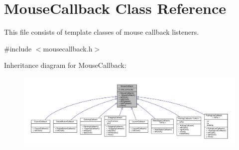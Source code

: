 \hypertarget{classMouseCallback}{}\section{Mouse\+Callback Class Reference}
\label{classMouseCallback}


This file consists of template classes of mouse callback listeners.  




{\ttfamily \#include $<$mousecallback.\+h$>$}



Inheritance diagram for Mouse\+Callback\+:
\nopagebreak
\begin{figure}[H]
\begin{center}
\leavevmode
\includegraphics[width=350pt]{classMouseCallback__inherit__graph}
\end{center}
\end{figure}


